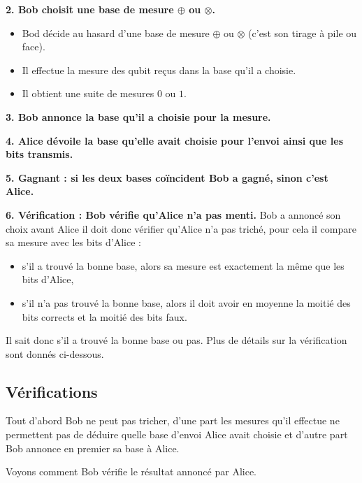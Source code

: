 \documentclass[11pt,class=report,crop=false]{standalone}
\begin{document}
\medskip

\textbf{2. Bob choisit une base de mesure $\oplus$ ou $\otimes$.}

\begin{itemize}
  \item Bod décide au hasard d'une base de mesure $\oplus$ ou $\otimes$ (c'est son tirage à pile ou face).
  \item Il effectue la mesure des qubit reçus dans la base qu'il a choisie.
  \item Il obtient une suite de mesures $0$ ou $1$.
\end{itemize}  


\medskip

\textbf{3. Bob annonce la base qu'il a choisie pour la mesure.}

\medskip

\textbf{4. Alice dévoile la base qu'elle avait choisie pour l'envoi ainsi que les bits transmis.}

\medskip

\textbf{5. Gagnant : si les deux bases coïncident Bob a gagné, sinon c'est Alice.}

\medskip

\textbf{6. Vérification : Bob vérifie qu'Alice n'a pas menti.}
Bob a annoncé son choix avant Alice il doit donc vérifier qu'Alice n'a pas triché, pour cela il compare sa mesure avec les bits d'Alice :
\begin{itemize}
  \item s'il a trouvé la bonne base, alors sa mesure est exactement la même que les bits d'Alice,
  \item s'il n'a pas trouvé la bonne base, alors il doit avoir en moyenne la moitié des bits corrects et la moitié des bits faux.
\end{itemize}
Il sait donc s'il a trouvé la bonne base ou pas.
Plus de détails sur la vérification sont donnés ci-dessous.


\subsection{Vérifications}


Tout d'abord Bob ne peut pas tricher, d'une part les mesures qu'il effectue ne permettent pas de déduire quelle base d'envoi Alice avait choisie et d'autre part Bob annonce en premier sa base à Alice.


Voyons comment Bob vérifie le résultat annoncé par Alice.
\end{document}

